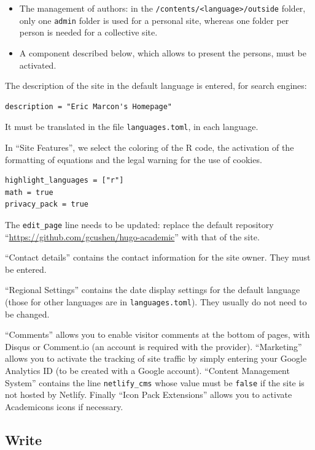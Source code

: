 \documentclass[
  12pt,
  american,
  a4paper,
  extrafontsizes,onecolumn,openright
  ]{memoir}
\providecommand{\tightlist}{%
  \setlength{\itemsep}{0pt}\setlength{\parskip}{0pt}}
\begin{document}
\begin{itemize}
\tightlist
\item
  The management of authors: in the \texttt{/contents/\textless{}language\textgreater{}/outside} folder, only one \texttt{admin} folder is used for a personal site, whereas one folder per person is needed for a collective site.
\item
  A component described below, which allows to present the persons, must be activated.
\end{itemize}

The description of the site in the default language is entered, for search engines:

\begin{verbatim}
description = "Eric Marcon's Homepage"
\end{verbatim}

It must be translated in the file \texttt{languages.toml}, in each language.

In \enquote{Site Features}, we select the coloring of the R code, the activation of the formatting of equations and the legal warning for the use of cookies.

\begin{verbatim}
highlight_languages = ["r"] 
math = true
privacy_pack = true
\end{verbatim}

The \texttt{edit\_page} line needs to be updated: replace the default repository \enquote{\url{https://github.com/gcushen/hugo-academic}} with that of the site.

\enquote{Contact details} contains the contact information for the site owner.
They must be entered.

\enquote{Regional Settings} contains the date display settings for the default language (those for other languages are in \texttt{languages.toml}).
They usually do not need to be changed.

\enquote{Comments} allows you to enable visitor comments at the bottom of pages, with Disqus or Comment.io (an account is required with the provider).
\enquote{Marketing} allows you to activate the tracking of site traffic by simply entering your Google Analytics ID (to be created with a Google account).
\enquote{Content Management System} contains the line \texttt{netlify\_cms} whose value must be \texttt{false} if the site is not hosted by Netlify.
Finally \enquote{Icon Pack Extensions} allows you to activate Academicons icons if necessary.

\hypertarget{write-2}{%
\subsection{Write}\label{write-2}}
\end{document}
